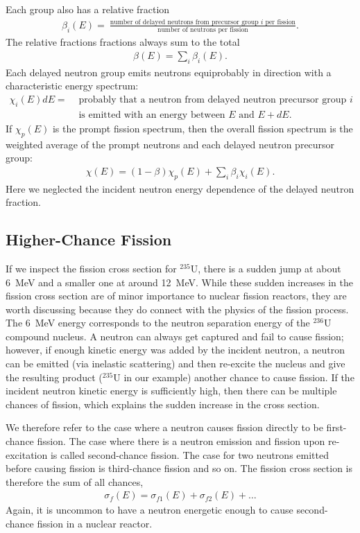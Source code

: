 Each group also has a relative fraction
\begin{align}
 \beta_i(E) = \ \frac{\text{number of delayed neutrons from precursor group $i$ per fission}}{\text{number of neutrons per fission}} . \nonumber
\end{align}
The relative fractions fractions always sum to the total
\begin{align}
  \beta(E) = \sum_i \beta_i(E). 
\end{align}
Each delayed neutron group emits neutrons equiprobably in direction with a characteristic energy spectrum:
\begin{align}
  \chi_i(E) dE = 	&\text{ probably that a neutron from delayed neutron precursor group $i$} \nonumber \\
  					&\text{ is emitted with an energy between $E$ and $E + dE$.} \nonumber
\end{align}
If $\chi_p(E)$ is the prompt fission spectrum, then the overall fission spectrum is the weighted average of the prompt neutrons and each delayed neutron precursor group:
\begin{align}
  \chi(E) = ( 1 - \beta ) \chi_p(E) + \sum_i \beta_i \chi_i(E).
\end{align}
Here we neglected the incident neutron energy dependence of the delayed neutron fraction.

\subsection{Higher-Chance Fission}

If we inspect the fission cross section for $^{235}$U, there is a sudden jump at about 6~MeV and a smaller one at around 12~MeV. While these sudden increases in the fission cross section are of minor importance to nuclear fission reactors, they are worth discussing because they do connect with the physics of the fission process. The 6~MeV energy corresponds to the neutron separation energy of the $^{236}$U compound nucleus. A neutron can always get captured and fail to cause fission; however, if enough kinetic energy was added by the incident neutron, a neutron can be emitted (via inelastic scattering) and then re-excite the nucleus and give the resulting product ($^{235}$U in our example) another chance to cause fission. If the incident neutron kinetic energy is sufficiently high, then there can be multiple chances of fission, which explains the sudden increase in the cross section.

We therefore refer to the case where a neutron causes fission directly to be first-chance fission. The case where there is a neutron emission and fission upon re-excitation is called second-chance fission. The case for two neutrons emitted before causing fission is third-chance fission and so on. The fission cross section is therefore the sum of all chances,
\begin{align}
  \sigma_f(E) = \sigma_{f1}(E) + \sigma_{f2}(E) + \ldots
\end{align}
Again, it is uncommon to have a neutron energetic enough to cause second-chance fission in a nuclear reactor.

